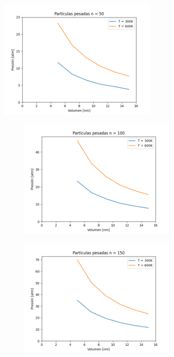 \documentclass[]{article}
\begin{document}
\begin{figure}[h]
    \begin{subfigure}
    \raggedright
     \includegraphics[width=8cm, height=6cm]{graficos/grafico1.pdf}
      \caption{\label{fig:ejemplo} mi figura}
    \end{subfigure}
    	\begin{subfigure}
    	  \raggedleft
    	\includegraphics[width=8cm, height=6cm]{graficos/grafico2.pdf}
    	\end{subfigure}
   \begin{subfigure}
    	  \centering
    	\includegraphics[width=8cm, height=6cm]{graficos/grafico3.pdf}
    	\end{subfigure}
\end{figure}
\end{document}
